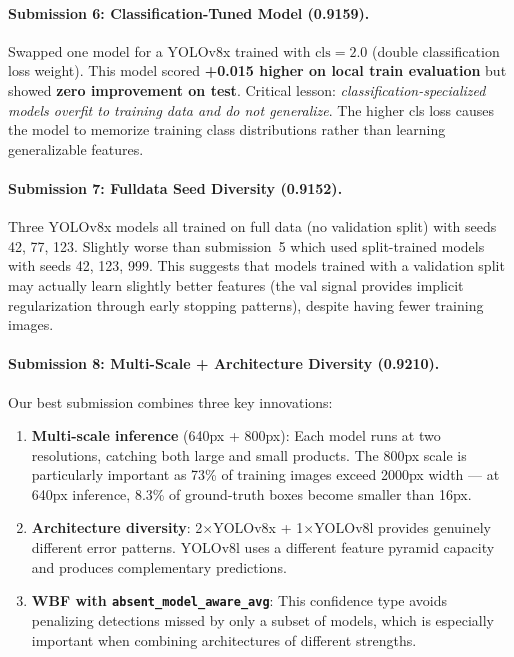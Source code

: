 \documentclass[11pt,a4paper]{article}
\begin{document}
\paragraph{Submission 6: Classification-Tuned Model (0.9159).}
Swapped one model for a YOLOv8x trained with $\text{cls}=2.0$ (double classification loss weight). This model scored \textbf{+0.015 higher on local train evaluation} but showed \textbf{zero improvement on test}. Critical lesson: \emph{classification-specialized models overfit to training data and do not generalize}. The higher cls loss causes the model to memorize training class distributions rather than learning generalizable features.

\paragraph{Submission 7: Fulldata Seed Diversity (0.9152).}
Three YOLOv8x models all trained on full data (no validation split) with seeds 42, 77, 123. Slightly worse than submission~5 which used split-trained models with seeds 42, 123, 999. This suggests that models trained with a validation split may actually learn slightly better features (the val signal provides implicit regularization through early stopping patterns), despite having fewer training images.

\paragraph{Submission 8: Multi-Scale + Architecture Diversity (0.9210).}
Our best submission combines three key innovations:
\begin{enumerate}
    \item \textbf{Multi-scale inference} (640px + 800px): Each model runs at two resolutions, catching both large and small products. The 800px scale is particularly important as 73\% of training images exceed 2000px width --- at 640px inference, 8.3\% of ground-truth boxes become smaller than 16px.
    \item \textbf{Architecture diversity}: 2$\times$YOLOv8x + 1$\times$YOLOv8l provides genuinely different error patterns. YOLOv8l uses a different feature pyramid capacity and produces complementary predictions.
    \item \textbf{WBF with \texttt{absent\_model\_aware\_avg}}: This confidence type avoids penalizing detections missed by only a subset of models, which is especially important when combining architectures of different strengths.
\end{enumerate}
\end{document}
